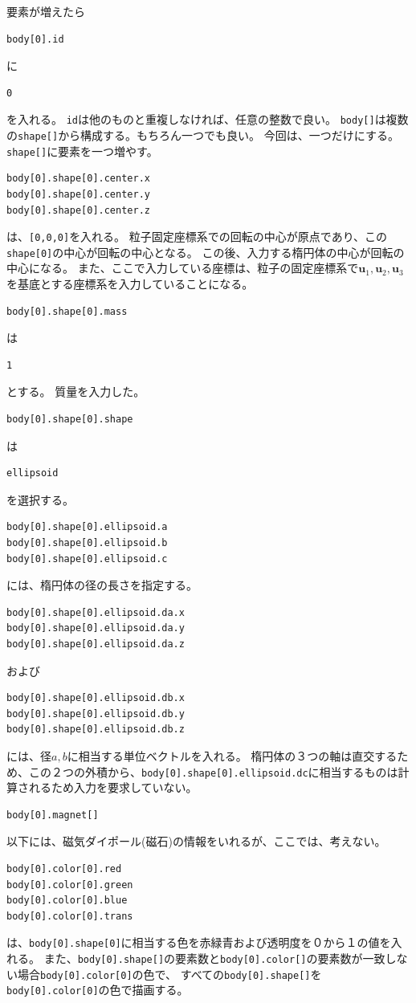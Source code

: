 \documentclass[a4paper,11pt]{jarticle}
\begin{document}
要素が増えたら
\begin{verbatim}
body[0].id
\end{verbatim}
に
\begin{verbatim}
0
\end{verbatim}
を入れる。
\verb|id|は他のものと重複しなければ、任意の整数で良い。
\verb|body[]|は複数の\verb|shape[]|から構成する。もちろん一つでも良い。
今回は、一つだけにする。\verb|shape[]|に要素を一つ増やす。
\begin{verbatim}
body[0].shape[0].center.x
body[0].shape[0].center.y
body[0].shape[0].center.z
\end{verbatim}
は、\verb|[0,0,0]|を入れる。
粒子固定座標系での回転の中心が原点であり、この\verb|shape[0]|の中心が回転の中心となる。
この後、入力する楕円体の中心が回転の中心になる。
また、ここで入力している座標は、粒子の固定座標系で$\bm{u}_1,\bm{u}_2,\bm{u}_3$を基底とする座標系を入力していることになる。
\begin{verbatim}
body[0].shape[0].mass
\end{verbatim}
は
\begin{verbatim}
1
\end{verbatim}
とする。
質量を入力した。
\begin{verbatim}
body[0].shape[0].shape
\end{verbatim}
は
\begin{verbatim}
ellipsoid
\end{verbatim}
を選択する。
\begin{verbatim}
body[0].shape[0].ellipsoid.a
body[0].shape[0].ellipsoid.b
body[0].shape[0].ellipsoid.c
\end{verbatim}
には、楕円体の径の長さを指定する。
\begin{verbatim}
body[0].shape[0].ellipsoid.da.x
body[0].shape[0].ellipsoid.da.y
body[0].shape[0].ellipsoid.da.z
\end{verbatim}
および
\begin{verbatim}
body[0].shape[0].ellipsoid.db.x
body[0].shape[0].ellipsoid.db.y
body[0].shape[0].ellipsoid.db.z
\end{verbatim}
には、径$a,b$に相当する単位ベクトルを入れる。
楕円体の３つの軸は直交するため、この２つの外積から、\verb|body[0].shape[0].ellipsoid.dc|に相当するものは計算されるため入力を要求していない。
\begin{verbatim}
body[0].magnet[]
\end{verbatim}
以下には、磁気ダイポール(磁石)の情報をいれるが、ここでは、考えない。
\begin{verbatim}
body[0].color[0].red
body[0].color[0].green
body[0].color[0].blue
body[0].color[0].trans
\end{verbatim}
は、\verb|body[0].shape[0]|に相当する色を赤緑青および透明度を０から１の値を入れる。
また、\verb|body[0].shape[]|の要素数と\verb|body[0].color[]|の要素数が一致しない場合\verb|body[0].color[0]|の色で、
すべての\verb|body[0].shape[]|を\verb|body[0].color[0]|の色で描画する。
\end{document}
